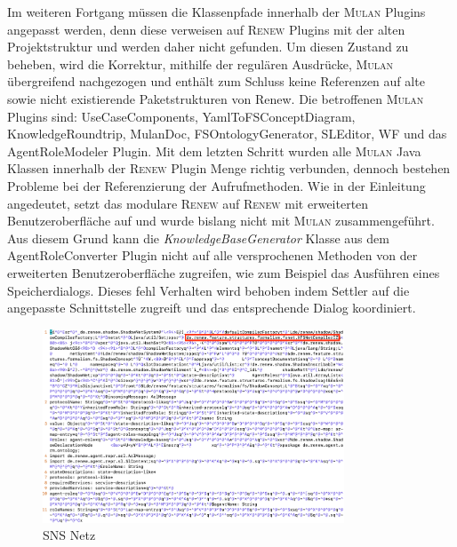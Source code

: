 	Im weiteren Fortgang müssen die Klassenpfade innerhalb der \textsc{Mulan} Plugins angepasst werden, denn diese verweisen auf \textsc{Renew} Plugins mit der alten Projektstruktur und werden daher nicht gefunden. Um diesen Zustand zu beheben, wird die Korrektur, mithilfe der regulären Ausdrücke, \textsc{Mulan} übergreifend nachgezogen und enthält zum Schluss keine Referenzen auf alte sowie nicht existierende Paketstrukturen von Renew. Die betroffenen \textsc{Mulan} Plugins sind: UseCaseComponents, YamlToFSConceptDiagram, KnowledgeRoundtrip, MulanDoc, FSOntologyGenerator, SLEditor, WF und das AgentRoleModeler Plugin. \newline
	Mit dem letzten Schritt wurden alle \textsc{Mulan} Java Klassen innerhalb der \textsc{Renew} Plugin Menge richtig verbunden, dennoch bestehen Probleme bei der Referenzierung der Aufrufmethoden. Wie in der Einleitung angedeutet, setzt das modulare \textsc{Renew} auf \textsc{Renew} mit erweiterten Benutzeroberfläche auf und wurde bislang nicht mit \textsc{Mulan} zusammengeführt. Aus diesem Grund kann die \textit{KnowledgeBaseGenerator} Klasse aus dem AgentRoleConverter Plugin nicht auf alle versprochenen Methoden von der erweiterten Benutzeroberfläche zugreifen, wie zum Beispiel das Ausführen eines Speicherdialogs. Dieses fehl Verhalten wird behoben indem Settler auf die angepasste Schnittstelle zugreift und das entsprechende Dialog koordiniert. \bigbreak

	\begin{figure}[h!]
	  \centering
	  \includegraphics[width=0.8\textwidth]{material/images/shadownet.png}
	  \caption{SNS Netz}
	  \label{fig:sns_netz}
	\end{figure}

